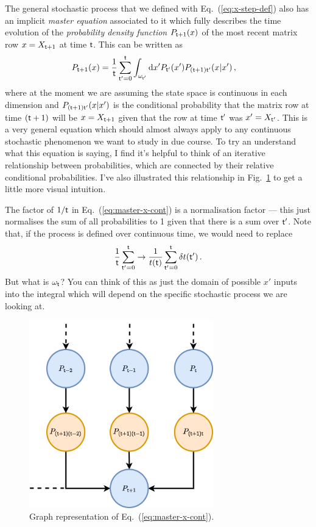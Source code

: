 \documentclass{book}
\begin{document}
The general stochastic process that we defined with Eq.~(\ref{eq:x-step-def}) also has an implicit \emph{master equation} associated to it which fully describes the time evolution of the \emph{probability density function} $P_{{\sf t}+1}(x)$ of the most recent matrix row $x=X_{{\sf t}+1}$ at time ${\sf t}$. This can be written as
\begin{align}
P_{{\sf t}+1}(x) &= \frac{1}{{\sf t}}\sum_{{\sf t}'=0}^{{\sf t}}\int_{\omega_{{\sf t}'}}{\rm d}x' P_{{\sf t}'}(x') P_{({\sf t}+1){\sf t}'}(x\vert x') \label{eq:master-x-cont} \,,
\end{align}
where at the moment we are assuming the state space is continuous in each dimension and $P_{({\sf t}+1){\sf t}'}(x\vert x')$ is the conditional probability that the matrix row at time $({\sf t}+1)$ will be $x=X_{{\sf t}+1}$ given that the row at time ${\sf t}'$ was $x'=X_{{\sf t}'}$. This is a very general equation which should almost always apply to any continuous stochastic phenomenon we want to study in due course. To try an understand what this equation is saying, I find it's helpful to think of an iterative relationship between probabilities, which are connected by their relative conditional probabilities. I've also illustrated this relationship in Fig.~\ref{fig:master-eqn} to get a little more visual intuition.

The factor of $1/{\sf t}$ in Eq.~(\ref{eq:master-x-cont}) is a normalisation factor --- this just normalises the sum of all probabilities to 1 given that there is a sum over ${\sf t}'$. Note that, if the process is defined over continuous time, we would need to replace 
\begin{align}
\frac{1}{{\sf t}}\sum_{{\sf t}'=0}^{{\sf t}} \rightarrow \frac{1}{t({\sf t})}\sum_{{\sf t}'=0}^{{\sf t}}\delta t({\sf t}') \,.
\end{align}
But what is $\omega_{\sf t}$? You can think of this as just the domain of possible $x'$ inputs into the integral which will depend on the specific stochastic process we are looking at.

\begin{figure}[h]
\centering
\includegraphics[width=8cm]{images/master-eq-graph.drawio.png}
\caption{Graph representation of Eq.~(\ref{eq:master-x-cont}).}
\label{fig:master-eqn}
\end{figure}
\end{document}
